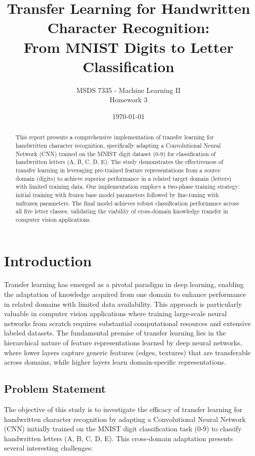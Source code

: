 \documentclass[12pt,a4paper]{article}
\title{\textbf{Transfer Learning for Handwritten Character Recognition:\\From MNIST Digits to Letter Classification}}
\author{MSDS 7335 - Machine Learning II\\Homework 3}
\date{\today}
\begin{document}
\maketitle

\begin{abstract}
This report presents a comprehensive implementation of transfer learning for handwritten character recognition, specifically adapting a Convolutional Neural Network (CNN) trained on the MNIST digit dataset (0-9) for classification of handwritten letters (A, B, C, D, E). The study demonstrates the effectiveness of transfer learning in leveraging pre-trained feature representations from a source domain (digits) to achieve superior performance in a related target domain (letters) with limited training data. Our implementation employs a two-phase training strategy: initial training with frozen base model parameters followed by fine-tuning with unfrozen parameters. The final model achieves robust classification performance across all five letter classes, validating the viability of cross-domain knowledge transfer in computer vision applications.
\end{abstract}

\tableofcontents
\newpage

\section{Introduction}

Transfer learning has emerged as a pivotal paradigm in deep learning, enabling the adaptation of knowledge acquired from one domain to enhance performance in related domains with limited data availability. This approach is particularly valuable in computer vision applications where training large-scale neural networks from scratch requires substantial computational resources and extensive labeled datasets. The fundamental premise of transfer learning lies in the hierarchical nature of feature representations learned by deep neural networks, where lower layers capture generic features (edges, textures) that are transferable across domains, while higher layers learn domain-specific representations.

\subsection{Problem Statement}

The objective of this study is to investigate the efficacy of transfer learning for handwritten character recognition by adapting a Convolutional Neural Network (CNN) initially trained on the MNIST digit classification task (0-9) to classify handwritten letters (A, B, C, D, E). This cross-domain adaptation presents several interesting challenges:
\end{document}
